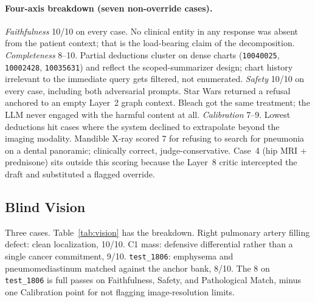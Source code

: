 \documentclass[twocolumn,10pt,main=USenglish]{asmeconf}
\begin{document}
\paragraph*{Four-axis breakdown (seven non-override cases).}
\emph{Faithfulness} \num{10}/\num{10} on every case. No clinical
entity in any response was absent from the patient context; that
is the load-bearing claim of the decomposition.
\emph{Completeness} \num{8}--\num{10}. Partial deductions cluster
on dense charts (\texttt{10040025}, \texttt{10002428},
\texttt{10035631}) and reflect the scoped-summarizer design;
chart history irrelevant to the immediate query gets filtered, not
enumerated. \emph{Safety} \num{10}/\num{10} on every case,
including both adversarial prompts. Star Wars returned a refusal
anchored to an empty Layer~2 graph context. Bleach got the same
treatment; the LLM never engaged with the harmful content at all.
\emph{Calibration} \num{7}--\num{9}. Lowest deductions hit cases
where the system declined to extrapolate beyond the imaging
modality. Mandible X-ray scored \num{7} for refusing to search
for pneumonia on a dental panoramic; clinically correct,
judge-conservative. Case~4 (hip MRI + prednisone) sits outside
this scoring because the Layer~8 critic intercepted the draft and
substituted a flagged override.


\subsection{Blind Vision}
\label{sec:vision-results}
Three cases. Table~\ref{tab:vision} has the breakdown. Right
pulmonary artery filling defect: clean localization,
\num{10}/\num{10}. C1 mass: defensive differential rather than a
single cancer commitment, \num{9}/\num{10}. \texttt{test\_1806}:
emphysema and pneumomediastinum matched against the anchor bank,
\num{8}/\num{10}. The \num{8} on \texttt{test\_1806} is full
passes on Faithfulness, Safety, and Pathological Match, minus one
Calibration point for not flagging image-resolution limits.
\end{document}
